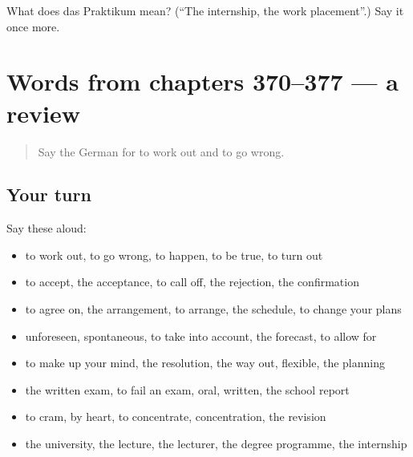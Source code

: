 \begin{tcolorbox}[breakable,colback=teal!4,colframe=teal!35!black,title={Before you move on}]
What does das Praktikum mean? (\textquotedblleft{}The internship, the work placement\textquotedblright{}.) Say it once more.
\end{tcolorbox}
\section[(dialogue)]{Words from chapters 370–377 — a review}

\label{lesson:GE-R377-review-370-377}



\begin{quote}
Say the German for to work out and to go wrong.
\end{quote}

\subsection*{Your turn}
Say these aloud:

\begin{itemize}
\raggedright
  \item to work out, to go wrong, to happen, to be true, to turn out
  \item to accept, the acceptance, to call off, the rejection, the confirmation
  \item to agree on, the arrangement, to arrange, the schedule, to change your plans
  \item unforeseen, spontaneous, to take into account, the forecast, to allow for
  \item to make up your mind, the resolution, the way out, flexible, the planning
  \item the written exam, to fail an exam, oral, written, the school report
  \item to cram, by heart, to concentrate, concentration, the revision
  \item the university, the lecture, the lecturer, the degree programme, the internship
\end{itemize}

